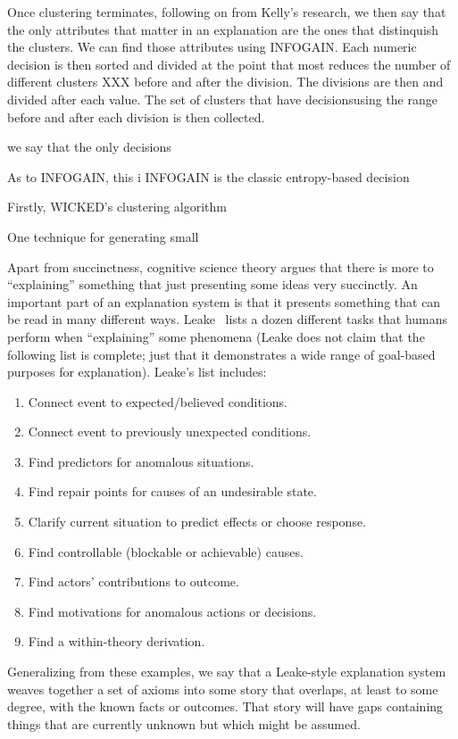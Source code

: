 \documentclass[runningheads]{llncs}
\newcommand{\be}{\begin{enumerate}}
\newcommand{\ee}{\end{enumerate}}
\begin{document}
Once clustering terminates, following on from Kelly's research,
we then say that the only attributes that matter in an explanation
are the ones
that distinquish the clusters. We can find those attributes using INFOGAIN.
Each numeric decision is then sorted and divided at the point
that most reduces the number of different clusters XXX before and after the
division. The divisions are then  and divided after each value. 
The set of clusters
that have decisionsusing the range before and after each division is then
collected.

 we say that the only decisions 

As to INFOGAIN, this i
INFOGAIN
is the classic entropy-based decision




Firstly, WICKED's clustering algorithm 

One technique for generating small 

Apart from succinctness, 
cognitive science theory argues that
there is more to ``explaining'' something that just
presenting some ideas very   succinctly. An important part of
an explanation system is that it presents something that
can be read in many different ways.
Leake~\cite{leake91}
lists a dozen different tasks that humans perform when 
``explaining'' some phenomena (Leake does not claim
that the following list is complete; just that
it demonstrates  a wide range of
goal-based purposes for explanation). Leake's list  includes:
\be
\item
Connect event to expected/believed conditions.
\item
Connect event to previously unexpected conditions.
\item
Find predictors for anomalous situations.
\item
Find repair points for causes of an undesirable state.
\item
Clarify current situation to predict effects or choose response.
\item
Find controllable (blockable or achievable) causes.
\item
Find actors’ contributions to outcome.
\item
Find motivations for anomalous actions or decisions.
\item
Find a within-theory derivation.  \ee 
Generalizing
from these examples, we say that a Leake-style
explanation system weaves together a set of axioms
into some story that overlaps, at least to some
degree, with the known facts or outcomes.  That
story will have gaps containing things that are
currently unknown but which might be assumed.
\end{document}
